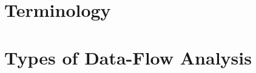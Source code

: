 \documentclass[bsc,twoside,singlespacing,parskip,logo,notimes,normalheadings]{infthesis}
\begin{document}
    




\begin{appendices}

\chapter{Terminology}\label{appx:glossary}

\printglossaries

\chapter{Types of Data-Flow Analysis}\label{appx:analysistypes}


\end{appendices}
\end{document}
